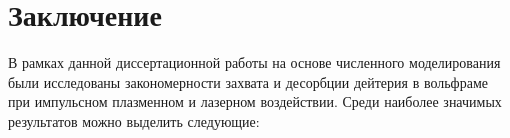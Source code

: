 \chapter*{Заключение}                       %


В рамках данной диссертационной работы на основе численного моделирования были исследованы закономерности захвата и десорбции дейтерия в вольфраме при импульсном плазменном и лазерном воздействии. Среди наиболее значимых результатов можно выделить следующие:

